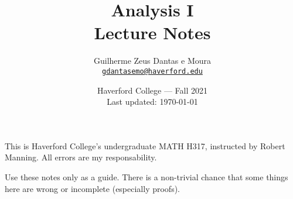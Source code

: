 \documentclass{scrbook}
\title{Analysis I\\Lecture Notes}
\author{Guilherme Zeus Dantas e Moura\\\href{mailto:gdantasemo@haverford.edu}{\texttt{gdantasemo@haverford.edu}}}
\date{Haverford College --- Fall 2021\\Last updated: \today}
\begin{document}
	\maketitle

		This is Haverford College's undergraduate MATH H317, instructed by Robert Manning.
		All errors are my responsability.

		Use these notes only as a guide. There is a non-trivial chance that some things here are wrong or incomplete (especially proofs).
	

		\tableofcontents
		\newpage

	
	
	
	
	
	
	
	
	
	
\end{document}
